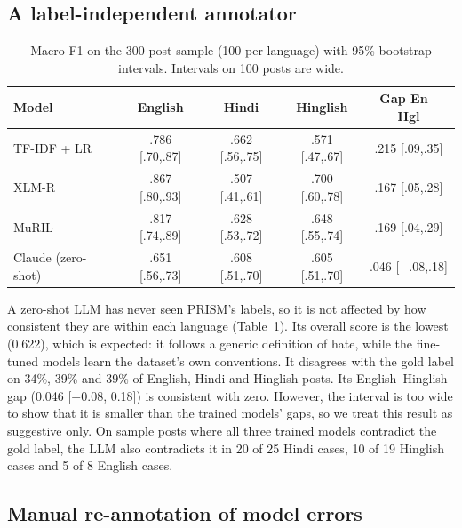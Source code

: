 \documentclass[11pt,a4paper]{article}
\begin{document}
\subsection{A label-independent annotator}

\begin{table}[h]
\centering
\small
\begin{tabular}{lcccc}
\toprule
Model & English & Hindi & Hinglish & Gap En$-$Hgl \\
\midrule
TF-IDF + LR & .786 {\scriptsize[.70,.87]} & .662 {\scriptsize[.56,.75]} & .571 {\scriptsize[.47,.67]} & .215 {\scriptsize[.09,.35]} \\
XLM-R & .867 {\scriptsize[.80,.93]} & .507 {\scriptsize[.41,.61]} & .700 {\scriptsize[.60,.78]} & .167 {\scriptsize[.05,.28]} \\
MuRIL & .817 {\scriptsize[.74,.89]} & .628 {\scriptsize[.53,.72]} & .648 {\scriptsize[.55,.74]} & .169 {\scriptsize[.04,.29]} \\
Claude (zero-shot) & .651 {\scriptsize[.56,.73]} & .608 {\scriptsize[.51,.70]} & .605 {\scriptsize[.51,.70]} & .046 {\scriptsize[$-$.08,.18]} \\
\bottomrule
\end{tabular}
\caption{Macro-F1 on the 300-post sample (100 per language) with 95\% bootstrap intervals. Intervals on 100 posts are wide.}
\label{tab:sample}
\end{table}

A zero-shot LLM has never seen PRISM's labels, so it is not affected by how consistent they are within each language (Table~\ref{tab:sample}).
Its overall score is the lowest (0.622), which is expected: it follows a generic definition of hate, while the fine-tuned models learn the dataset's own conventions.
It disagrees with the gold label on 34\%, 39\% and 39\% of English, Hindi and Hinglish posts.
Its English--Hinglish gap (0.046 [$-0.08$, 0.18]) is consistent with zero.
However, the interval is too wide to show that it is smaller than the trained models' gaps, so we treat this result as suggestive only.
On sample posts where all three trained models contradict the gold label, the LLM also contradicts it in 20 of 25 Hindi cases, 10 of 19 Hinglish cases and 5 of 8 English cases.

\subsection{Manual re-annotation of model errors}
\end{document}
